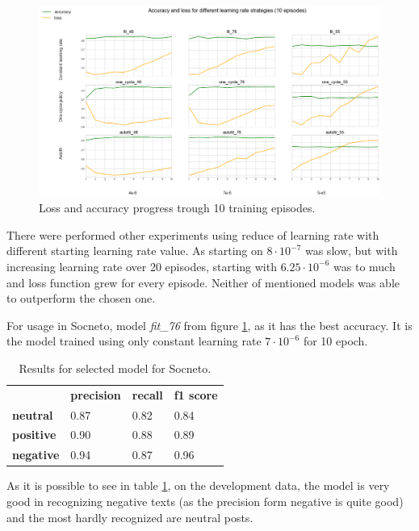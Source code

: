 \begin{figure}[H]
\centering
\includegraphics[width=1\textwidth]{diagrams/acc_loss.png}
\caption{ Loss and accuracy progress trough 10 training episodes.
}
\label{fig:acc_loss}
\end{figure}

There were performed other experiments using reduce of learning rate with different starting learning rate value. As starting on $8\cdot10^{-7}$ was slow, but with increasing learning rate over 20 episodes, starting with $6.25\cdot10^{-6}$ was to much and loss function grew for every episode. Neither of mentioned models was able to outperform the chosen one.


\par
For usage in Socneto, model \textit{fit\_76} from figure \ref{fig:acc_loss}, as it has the best accuracy. It is the model trained using only constant learning rate $7\cdot10^{-6}$ for 10 epoch. \\
\begin{center}
    

\begin{table}[H]
\label{table:resultsAnalysis}
\begin{tabular}{llll}
         & \textbf{precision} & \textbf{recall} & \textbf{f1 score} \\
\textbf{neutral}  & 0.87      & 0.82   & 0.84     \\
\textbf{positive} & 0.90      & 0.88   & 0.89     \\
\textbf{negative} & 0.94      & 0.87   & 0.96    
\end{tabular}
\caption{
Results for selected model for Socneto.}
\end{table}
\end{center}
As it is possible to see in table \ref{table:resultsAnalysis}, on the development data, the model is very good in recognizing negative texts (as the precision form negative is quite good) and the most hardly recognized are neutral posts.
